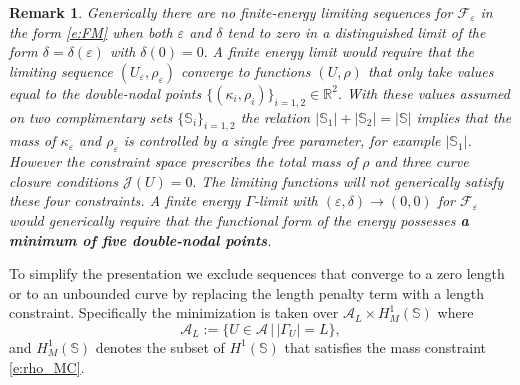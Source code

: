 \documentclass[11pt]{amsart}
\theoremstyle{plain}
\newcommand{\beq}{\begin{equation}}
\newcommand{\eeq}{\end{equation}}
\def\cA{{\mathcal A}}
\def\cF{{\mathcal F}}
\def\cJ{{\mathcal J}}
\def\mbbR{\mathbb{R}}
\def\mbbS{\mathbb{S}}
\def\eps{\varepsilon}
\def\cF{{\mathcal F}}
\numberwithin{equation}{section}
\theoremstyle{plain}
\newtheorem{remark}{Remark}
\begin{document}
\begin{remark}
Generically there are no finite-energy limiting sequences for $\cF_\eps$ in the form \eqref{e:FM} when both $\eps$ and $\delta$ tend to zero in a distinguished limit of the form $\delta=\delta(\eps)$ with $\delta(0)=0.$  A finite energy limit would require that the limiting sequence $(U_\eps,\rho_\eps)$ converge to functions $(U,\rho)$ that only take values equal to the double-nodal points
$\{(\kappa_i,\rho_i)\}_{i=1,2}\in\mbbR^2$. With these values assumed on two complimentary sets 
$\{\mbbS_i\}_{i=1,2}$ the relation $|\mbbS_1|+|\mbbS_2|=|\mbbS|$ implies that the mass of $\kappa_\eps$ and $\rho_\eps$ is controlled by a single free parameter, for example $|\mbbS_1|$. However the constraint space prescribes the total mass of $\rho$ and  three curve closure conditions $\cJ(U)=0.$ The limiting functions will not generically satisfy these four constraints. 
A finite energy $\Gamma$-limit with $(\eps,\delta)\to (0,0)$ for $\cF_\eps$ would generically require that the functional form of the energy possesses   {\bf a minimum of five double-nodal points}.
\end{remark}

To simplify the presentation we exclude sequences that converge to a zero length or to an unbounded curve by replacing the length penalty term with a length constraint. Specifically the minimization is taken over $\cA_L\times H^1_M(\mbbS)$ where
\beq
\cA_L:= \{ U\in\cA\,\bigl|\, |\Gamma_U|=L\},
\eeq
and $H^1_M(\mbbS)$ denotes the subset of $H^1(\mbbS)$ that satisfies the mass constraint \eqref{e:rho_MC}.
\end{document}
